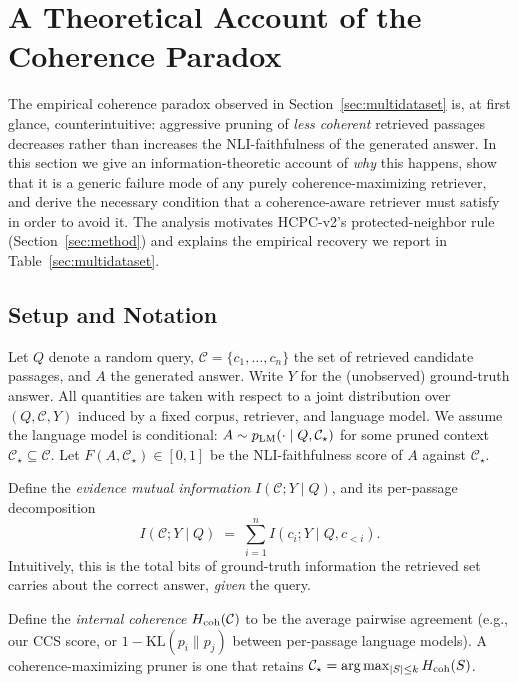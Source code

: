 
\section{A Theoretical Account of the Coherence Paradox}
\label{sec:theory}

The empirical coherence paradox observed in
Section~\ref{sec:multidataset} is, at first glance, counterintuitive:
aggressive pruning of \emph{less coherent} retrieved passages decreases
rather than increases the NLI-faithfulness of the generated answer.  In this
section we give an information-theoretic account of \emph{why} this
happens, show that it is a generic failure mode of any purely
coherence-maximizing retriever, and derive the necessary condition that a
coherence-aware retriever must satisfy in order to avoid it.  The analysis
motivates HCPC-v2's protected-neighbor rule
(Section~\ref{sec:method}) and explains the empirical recovery we
report in Table~\ref{sec:multidataset}.

\subsection{Setup and Notation}

Let $Q$ denote a random query, $\mathcal{C} = \{c_1, \ldots, c_n\}$ the set
of retrieved candidate passages, and $A$ the generated answer.  Write $Y$
for the (unobserved) ground-truth answer.  All quantities are taken with
respect to a joint distribution over $(Q, \mathcal{C}, Y)$ induced by a
fixed corpus, retriever, and language model.  We assume the language model
is conditional: $A \sim p_{\textup{LM}}(\cdot \mid Q, \mathcal{C}_\star)$
for some pruned context $\mathcal{C}_\star \subseteq \mathcal{C}$.  Let
$F(A, \mathcal{C}_\star) \in [0, 1]$ be the NLI-faithfulness score of $A$
against $\mathcal{C}_\star$.

Define the \emph{evidence mutual information}
$I(\mathcal{C}; Y \mid Q)$, and its per-passage decomposition
\[
  I(\mathcal{C}; Y \mid Q)
  \;=\;
  \sum_{i=1}^{n} I(c_i; Y \mid Q, c_{<i}).
\]
Intuitively, this is the total bits of ground-truth information the
retrieved set carries about the correct answer, \emph{given} the query.

Define the \emph{internal coherence}
$H_{\textup{coh}}(\mathcal{C})$ to be the average pairwise agreement (e.g.,
our CCS score, or $1 - \mathrm{KL}(p_i \| p_j)$ between per-passage language
models).  A coherence-maximizing pruner is one that retains
$\mathcal{C}_\star = \arg\max_{|S| \leq k} H_{\textup{coh}}(S)$.

